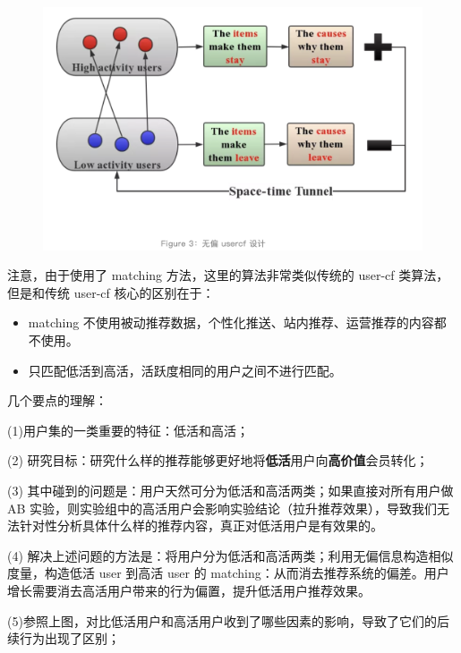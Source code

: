 \documentclass[12pt]{article}
\begin{document}
\begin{figure}[H]
    \centering
    \includegraphics[width=1\textwidth]{fig/CasualInferenceInAli-User-CF.png}
\end{figure}

注意，由于使用了 matching 方法，这里的算法非常类似传统的 user-cf 类算法，但是和传统 user-cf 核心的区别在于：
\begin{itemize}
\setlength{\itemsep}{0pt}
\setlength{\parsep}{0pt}
\setlength{\parskip}{0pt}
    \item matching 不使用被动推荐数据，个性化推送、站内推荐、运营推荐的内容都不使用。
    \item 只匹配低活到高活，活跃度相同的用户之间不进行匹配。
\end{itemize}

\begin{framed}
几个要点的理解：

(1)用户集的一类重要的特征：低活和高活；

(2) 研究目标：研究什么样的推荐能够更好地将\textbf{低活}用户向\textbf{高价值}会员转化；

(3) 其中碰到的问题是：用户天然可分为低活和高活两类；如果直接对所有用户做 AB 实验，则实验组中的高活用户会影响实验结论（拉升推荐效果），导致我们无法针对性分析具体什么样的推荐内容，真正对低活用户是有效果的。

(4) 解决上述问题的方法是：将用户分为低活和高活两类；利用无偏信息构造相似度量，构造低活 user 到高活 user 的 matching：从而消去推荐系统的偏差。用户增长需要消去高活用户带来的行为偏置，提升低活用户推荐效果。

(5)参照上图，对比低活用户和高活用户收到了哪些因素的影响，导致了它们的后续行为出现了区别；
\end{framed}
\end{document}
